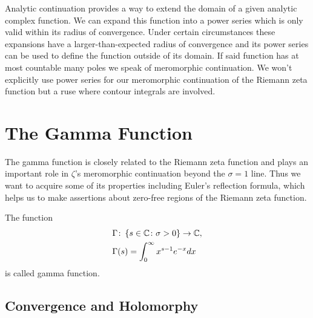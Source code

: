 Analytic continuation provides a way to extend the domain of a given analytic complex function. We can expand this function into a power series which is only valid within its radius of convergence. Under certain circumstances these expansions have a larger-than-expected radius of convergence and its power series can be used to define the function outside of its domain. If said function has at most countable many poles we speak of meromorphic continuation. We won't explicitly use power series  for our meromorphic continuation of the Riemann zeta function but a ruse where contour integrals are involved.


\section{The Gamma Function}
The gamma function is closely related to the Riemann zeta function and plays an important role in $\zeta$'s meromorphic continuation beyond the $\sigma = 1$ line. Thus we want to acquire some of its properties including Euler's reflection formula, which helps us to make assertions about zero-free regions of the Riemann zeta function.


\begin{definition}
	The function
\begin{equation*}
\begin{aligned}
	&\Gamma \colon \left\{s \in \mathbb{C} \colon \sigma > 0\right\} \to \mathbb{C}, \\
	&\Gamma(s) = \int _0 ^\infty x^{s - 1} e^{-x} dx
\end{aligned}
\end{equation*}
	is called gamma function.
\end{definition}


\subsection{Convergence and Holomorphy}


